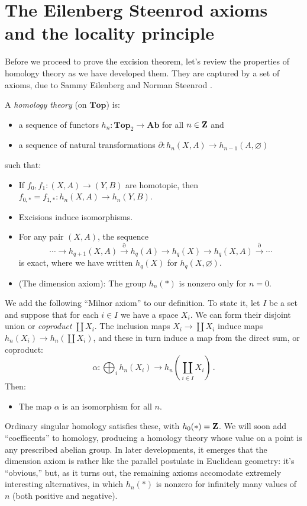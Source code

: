 \section{The Eilenberg Steenrod axioms and the locality principle}


Before we proceed to prove the excision theorem, let's review the properties of homology theory as we have developed them. They are captured by a set of axioms, due to Sammy Eilenberg and Norman Steenrod \cite{eilenberg-steenrod}. 
\begin{definition}
A {\em homology theory} (on $\mathbf{Top}$) is:
\begin{itemize}
\item a sequence of functors $h_n:\mathbf{Top}_2\to\mathbf{Ab}$ for all $n\in\mathbf Z$ and
\item a sequence of natural transformations $\partial:h_n(X,A)\to h_{n-1}(A,\varnothing)$
\end{itemize}
such that:
\begin{itemize}
\item If $f_0,f_1:(X,A)\to (Y,B)$ are homotopic, then $f_{0,\ast}=f_{1,\ast}:h_n(X,A)\to h_n(Y,B)$.
\item Excisions induce isomorphisms.
\item For any pair $(X,A)$, the sequence 
\begin{equation*}
\cdots\to h_{q+1}(X,A)\xrightarrow{\partial}h_q(A)\to h_q(X)\to h_q(X,A)\xrightarrow{\partial}\cdots
\end{equation*}
is exact, where we have written $h_q(X)$ for $h_q(X,\varnothing)$.
\item (The dimension axiom): The group $h_n(\ast)$ is nonzero only for $n=0$. 
\end{itemize}
\end{definition}
We add the following ``Milnor axiom'' \cite{milnor}
to our definition. To state it,
let $I$ be a set and suppose that for each $i\in I$ we have a space $X_i$. We can form their disjoint union or {\em coproduct} $\coprod X_i$. The inclusion maps $X_i\to\coprod X_i$ induce maps $h_n(X_i)\to h_n(\coprod X_i)$, and these in turn induce a map from the direct sum, or coproduct:
\[
\alpha:\bigoplus_i h_n(X_i)\to h_n\left(\coprod_{i\in I} X_i\right)\,.
\]
Then:
\begin{itemize}
\item The map $\alpha$ is an isomorphism for all $n$.
\end{itemize}

Ordinary singular homology satisfies these, with $h_0(\ast)=\mathbf Z$. We will soon add ``coefficents'' to homology, producing a homology theory whose value on a point is any prescribed abelian group. In later developments, it 
emerges that the dimension axiom is rather like the parallel postulate
in Euclidean geometry: it's ``obvious,'' but, as it turns out, the remaining
axioms accomodate extremely interesting alternatives, in which
$h_n(*)$ is nonzero for infinitely many values of $n$ (both positive and negative). 

